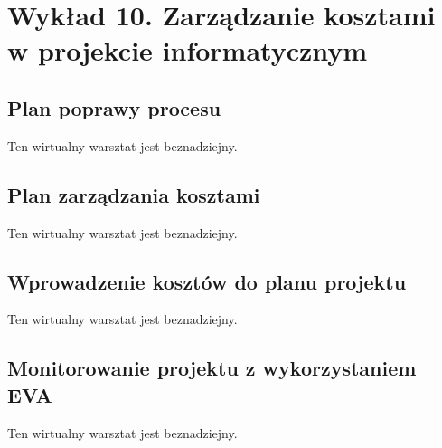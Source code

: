 \chapter{Wykład 10. Zarządzanie kosztami w projekcie informatycznym}

\section{Plan poprawy procesu}

Ten wirtualny warsztat jest beznadziejny.


\section{Plan zarządzania kosztami}

Ten wirtualny warsztat jest beznadziejny.


\section{Wprowadzenie kosztów do planu projektu}

Ten wirtualny warsztat jest beznadziejny.


\section{Monitorowanie projektu z wykorzystaniem EVA}

Ten wirtualny warsztat jest beznadziejny.


